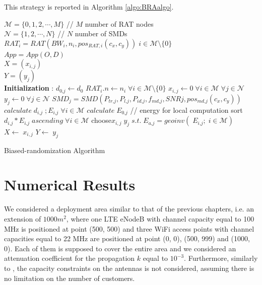 \documentclass[twoside,openright]{report}
\newenvironment{boxedalgorithmic}
{\begin{lrbox}{\ieeealgbox}
\begin{minipage}{\dimexpr\columnwidth-2\fboxsep-2\fboxrule}
\begin{algorithmic}}
{\end{algorithmic}
\end{minipage}
\end{lrbox}\noindent\fbox{\usebox{\ieeealgbox}}}
\begin{document}
This strategy is reported in Algorithm \autoref{algo:BRAalgo}.    
\begin{algorithm}[htbp]
\begin{boxedalgorithmic}
\renewcommand{\algorithmiccomment}[1]{// #1}
\renewcommand{\algorithmicrequire}{\textbf{Inputs:}}
\renewcommand{\algorithmicensure}{\textbf{Output:}}
\REQUIRE $\,$\\
$\mathcal{M} = \{{0,1,2,\cdots, M\}}$ // $M$ number of RAT nodes \\
$\mathcal{N} = \{{1,2,\cdots, N\}}$ // $N$ number of SMDs \\
$\textit{RAT}_i = \textit{RAT}(\textit{BW}_i, n_i, pos_{RAT,i}(c_x,c_y))\;i \in \mathcal{M}\setminus \{{0\}}$\\
\STATE $\textit{App}=\textit{App}(O,D)$
\ENSURE $\,$\\
$X = (x_{i,j})$\\  
$Y = (y_j)$ \\
\textbf{Initialization} :
\STATE $d_\textit{0,j} \leftarrow d_0$ 
\STATE $\textit{RAT}_{i}.n \leftarrow  n_i \;\forall i \in \mathcal{M}\setminus \{{0\}}$
\STATE $x_{i,j} \leftarrow 0 \;\forall i \in \mathcal{M} \;\forall j \in \mathcal{N}$ 
\STATE $y_j  \leftarrow 0 \;\forall j \in \mathcal{N}$
\STATE $\textit{SMD}_j = \textit{SMD}(P_\textit{tr,j},P_\textit{l,j},P_\textit{id,j},f_\textit{md,j},\textit{SNRj}, pos_\textit{md,j}(c_x,c_y))$
\STATE $calculate\;d_\textit{i,j} \; ; E_\textit{i,j}\;\forall i \in \mathcal{M}$
\STATE $calculate\;E_\textit{0,j}$ // energy for local computation
\STATE sort $d_\textit{i,j} * E_\textit{i,j} \; ascending \; \forall i \in  \mathcal{M}$
\STATE choose\;$x_{i,j}\;y_{j}\;s.t.\;E_\textit{a,j}= geoinv(\;E_\textit{i,j};\; i \in \mathcal{M})$
\STATE $X \leftarrow  \; x_{i,j}$
\STATE $Y \leftarrow  \; y_j$
\ENDFOR
\end{boxedalgorithmic}
\caption{Biased-randomization Algorithm}
\label{algo:BRAalgo}
\end{algorithm}

\section{Numerical Results}
\label{sec:numerical-results-5}
We considered a deployment area similar to that of the previous chapters, i.e. an extension of $1000 m^2$, where one \gls{LTE} eNodeB with channel capacity equal to 100 MHz is positioned at point (500, 500) and three \gls{WiFi} access points with channel capacities equal to 22 MHz are positioned at point (0, 0), (500, 999) and (1000, 0). 
Each of them is supposed to cover the entire area and we considered an attenuation coefficient for the propagation $k$ equal to $10^{-3}$. 
Furthermore, similarly to \cite{Globecom2014}, the capacity constraints on the antennas is not considered, assuming there is no limitation on the number of customers.
\end{document}
